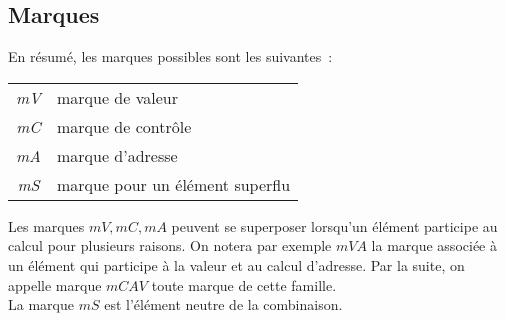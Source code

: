 \subsection{Marques}

En résumé, les marques possibles sont les suivantes~:
\begin{center}
\begin{tabular}{|>{\itshape}c!{:}l|}
  \hline
  mV & marque de valeur \\
  mC & marque de contrôle \\
  mA & marque d'adresse \\
  mS & marque pour un élément superflu\\
  \hline
\end{tabular}
\end{center}

Les marques $mV,mC,mA$ peuvent se superposer lorsqu'un élément participe au
calcul pour plusieurs raisons. On notera par exemple $mVA$ la marque associée à
un élément qui participe à la valeur et au calcul d'adresse. Par la suite,
on appelle marque $mCAV$ toute marque de cette famille.\\

La marque $mS$ est l'élément neutre de la combinaison.
